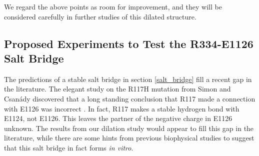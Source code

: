 We regard the above points as room for improvement, and they will be considered carefully in further studies of this dilated structure.







\subsection{Proposed Experiments to Test the R334-E1126 Salt Bridge}

The predictions of a stable salt bridge in section \ref{salt_bridge} fill a recent gap in the literature. The elegant study on the R117H mutation from Simon and Csanády \cite{simon2021} discovered that a long standing conclusion that R117 made a connection with E1126 was incorrect \cite{cui2014}. In fact, R117 makes a stable hydrogen bond with E1124, not E1126. This leaves the partner of the negative charge in E1126 unknown. The results from our dilation study would appear to fill this gap in the literature, while there are some hints from previous biophysical studies to suggest that this salt bridge in fact forms \textit {in vitro}.


